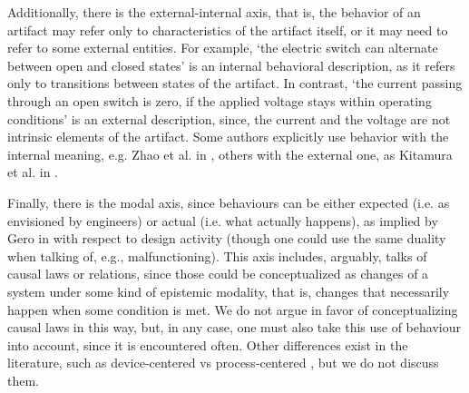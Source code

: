 \documentclass[sw]{iosart2x}
\newcommand{\TODO}[1]{{%
}}
\newcommand{\myComment}[1]{{\unskip \ignorespaces}}
\begin{document}
Additionally, there is the external-internal axis, that is, the behavior of an artifact may refer only to characteristics of the artifact itself, or it may need to refer to some external entities.
For example, `the electric switch can alternate between open and closed states' is an internal behavioral description, as it refers only to transitions between states of the artifact.
In contrast, `the current passing through an open switch is zero, if the applied voltage stays within operating conditions' is an external description, since, the current and the voltage are not intrinsic elements of the artifact. %
Some authors explicitly use behavior with the internal meaning, e.g. Zhao et al. in \cite{zhaoStateBehaviorFunction2019}, others with the external one, as Kitamura et al. in \cite{kitamuraOntologybasedSystematizationFunctional2004}.%

Finally, there is the modal axis, since \myComment{for \textcolor{blue}{(since? considering that?)}} behaviours can be \myComment{\textcolor{blue}{(either)}} either expected (i.e. as envisioned by engineers) or actual (i.e. what actually happens), as implied by Gero in \cite{geroSituatedFunctionBehaviour2004} with respect to design activity (though one could use the same duality when talking of, e.g., malfunctioning).
This axis includes, arguably, talks of causal laws or relations, since those could be conceptualized as changes of a system under some kind of epistemic modality, that is, changes that necessarily happen when some condition is met.
We do not argue in favor of conceptualizing causal laws in this way, but, in any case, one must also take this use of behaviour into account, since it is encountered often. %
Other differences exist in the literature, such as device-centered vs process-centered \cite{chandrasekaranFunctionDeviceRepresentation2000}, but we do not discuss them. 

\end{document}
